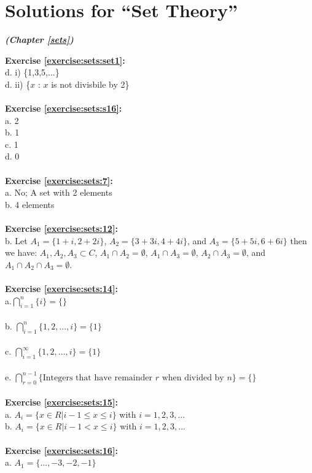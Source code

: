 
\section{Solutions for ``Set Theory''}
\noindent\textbf{\textit{ (Chapter \ref{sets})}}\bigskip

\textbf{Exercise \ref{exercise:sets:set1}:}\\
d. i) \{1,3,5,...\}\\
d. ii) \{$x$ : $x$ is not divisbile by 2\}\\
\\
\textbf{Exercise \ref{exercise:sets:s16}:}\\
a. 2\\
b. 1\\
c. 1\\
d. 0\\
\\
\textbf{Exercise \ref{exercise:sets:7}:}\\
a. No; A set with 2 elements\\
b. 4 elements\\
\\
\textbf{Exercise \ref{exercise:sets:12}:}\\
b. Let $A_1=\{ 1+i,2+2i\}$, $A_2=\{ 3+3i,4+4i\}$, and $A_3=\{5+5i,6+6i\}$ then we have:
$A_1,A_2,A_3 \subset C$, $A_1 \cap A_2=\emptyset$, $A_1 \cap A_3=\emptyset$, $A_2 \cap A_3=\emptyset$, and $A_1 \cap A_2 \cap A_3=\emptyset$.\\
\\
\textbf{Exercise \ref{exercise:sets:14}:}\\
a.$\bigcap_{i = 1}^{n}  \{i\}=\{\}$\\
\\
b. $\bigcap^{n}_{i=1} \{ 1,2,...,i \}=\{1\}$\\
\\
c. $\bigcap^{\infty}_{i=1} \{ 1,2,...,i \}=\{1\}$\\
\\
e. $\bigcap_{r = 0}^{n-1}  \{\mbox{Integers that have remainder }r \mbox{ when divided by }n\}=\{\}$\\
\\
\textbf{Exercise \ref{exercise:sets:15}:}\\
a. $A_i=\{x\in R|i-1 \le x\le i\}$ with $i=1,2,3,...$\\
b. $A_i=\{x\in R|i-1 < x\le i\}$ with $i=1,2,3,...$\\
\\
\textbf{Exercise \ref{exercise:sets:16}:}\\
a. $A_1=\{...,-3,-2,-1\} $\\
